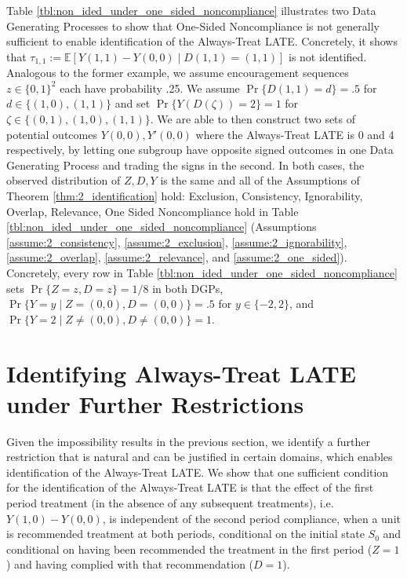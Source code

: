Table \ref{tbl:non_ided_under_one_sided_noncompliance} illustrates two Data Generating Processes to show that One-Sided Noncompliance is not generally sufficient to enable identification of the Always-Treat LATE.
Concretely, it shows that $\tau_{1,1} := \mathbb{E}[Y(1,1)-Y(0,0) \mid D(1,1) = (1,1)]$ is not identified.
Analogous to the former example, we assume encouragement sequences $z \in \{0,1\}^2$ each have probability .25.
We assume $\Pr\{D(1,1)=d\}=.5$ for $d \in \{(1,0), (1,1)\}$ and set $\Pr\{ Y(D(\zeta))=2 \}=1$ for $\zeta \in \{(0,1), (1,0), (1,1)\}$.
We are able to then construct two sets of potential outcomes $Y(0,0), Y'(0,0)$ where the Always-Treat LATE is 0 and 4 respectively, by letting one subgroup have opposite signed outcomes in one Data Generating Process and trading the signs in the second.
In both cases, the observed distribution of $Z, D, Y$ is the same and all of the Assumptions of Theorem \ref{thm:2_identification} hold: Exclusion, Consistency, Ignorability, Overlap, Relevance, One Sided Noncompliance hold in Table \ref{tbl:non_ided_under_one_sided_noncompliance} (Assumptions \ref{assume:2_consistency}, \ref{assume:2_exclusion}, \ref{assume:2_ignorability}, \ref{assume:2_overlap}, \ref{assume:2_relevance}, and \ref{assume:2_one_sided}).
Concretely, every row in Table \ref{tbl:non_ided_under_one_sided_noncompliance} sets $\Pr\{Z=z, D=z\}=1/8$ in both DGPs, $\Pr\{Y=y \mid Z=(0,0), D=(0,0)\}=.5$ for $y \in \{-2, 2\}$, and $\Pr\{Y=2 \mid Z\neq(0,0), D\neq(0,0)\}=1$.









\section{Identifying Always-Treat LATE under Further Restrictions}\label{sec:always-treat}

Given the impossibility results in the previous section, we identify a further restriction that is natural and can be justified in certain domains, which enables identification of the Always-Treat LATE. We show that one sufficient condition for the identification of the Always-Treat LATE is that the effect of the first period treatment (in the absence of any subsequent treatments), i.e. $Y(1,0)-Y(0,0)$, is independent of the second period compliance, when a unit is recommended treatment at both periods, conditional on the initial state $S_0$ and conditional on having been recommended the treatment in the first period ($Z=1$) and having complied with that recommendation ($D=1$).

